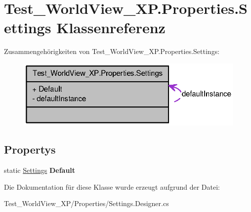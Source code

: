 \hypertarget{class_test___world_view___x_p_1_1_properties_1_1_settings}{
\section{Test\_\-WorldView\_\-XP.Properties.Settings Klassenreferenz}
\label{class_test___world_view___x_p_1_1_properties_1_1_settings}
}


Zusammengehörigkeiten von Test\_\-WorldView\_\-XP.Properties.Settings:\nopagebreak
\begin{figure}[H]
\begin{center}
\leavevmode
\includegraphics[width=318pt]{class_test___world_view___x_p_1_1_properties_1_1_settings__coll__graph}
\end{center}
\end{figure}
\subsection*{Propertys}
\begin{DoxyCompactItemize}
\item 
\hypertarget{class_test___world_view___x_p_1_1_properties_1_1_settings_a52138b2404ca3013b2d7812d8244a4dc}{
static \hyperlink{class_test___world_view___x_p_1_1_properties_1_1_settings}{Settings} {\bfseries Default}}
\label{class_test___world_view___x_p_1_1_properties_1_1_settings_a52138b2404ca3013b2d7812d8244a4dc}

\end{DoxyCompactItemize}


Die Dokumentation für diese Klasse wurde erzeugt aufgrund der Datei:\begin{DoxyCompactItemize}
\item 
Test\_\-WorldView\_\-XP/Properties/Settings.Designer.cs\end{DoxyCompactItemize}
